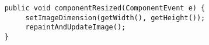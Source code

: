 \begin{verbatim}
	public void componentResized(ComponentEvent e) {
	     setImageDimension(getWidth(), getHeight());
	     repaintAndUpdateImage();
	}
\end{verbatim}
